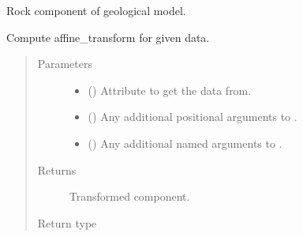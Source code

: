\documentclass[letterpaper,10pt,english]{sphinxmanual}
\begin{document}
\begin{fulllineitems}
\label{\detokenize{api/rock:geology.src.Rock}}
Rock component of geological model.

\begin{fulllineitems}
\label{\detokenize{api/rock:geology.src.Rock.affine_transform}}
Compute affine\_transform for given data.
\begin{quote}\begin{description}
\item[{Parameters}] \leavevmode\begin{itemize}
\item {} 
 (\sphinxstyleliteralemphasis{\sphinxupquote{, }}) \textendash{} Attribute to get the data from.

\item {} 
 () \textendash{} Any additional positional arguments to .

\item {} 
 () \textendash{} Any additional named arguments to .

\end{itemize}

\item[{Returns}] \leavevmode
{} \textendash{} Transformed component.

\item[{Return type}] \leavevmode
{\hyperref[\detokenize{api/base_classes:geology.src.base_spatial.SpatialComponent}]{}}

\end{description}\end{quote}


\end{fulllineitems}
\end{fulllineitems}
\end{document}
